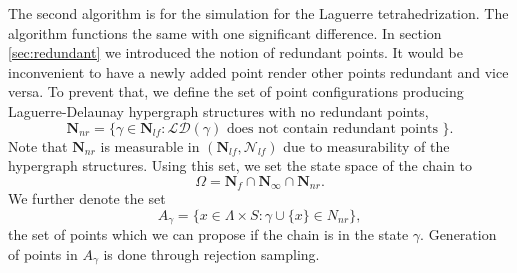 The second algorithm is for the simulation for the Laguerre tetrahedrization. The algorithm functions the same with one significant difference. In section \ref{sec:redundant} we introduced the notion of redundant points. It would be inconvenient to have a newly added point render other points redundant and vice versa. To prevent that, we define the set of point configurations producing Laguerre-Delaunay hypergraph structures with no redundant points,
$$\mathbf N_{nr} = \{ \gamma \in \mathbf N_{lf}: \mathcal {LD}(\gamma) \text{ does not contain redundant points }\}.$$ 
Note that $\mathbf N_{nr}$ is  measurable in $(\mathbf N_{lf}, \mathcal N_{lf})$ due to measurability of the hypergraph structures.  Using this set, we set the state space of the chain to
$$\Omega = \mathbf N_f \cap \mathbf N_\infty \cap \mathbf N_{nr}.$$
We further denote the set 
$$A_\gamma = \{ x \in \Lambda \times S: \gamma\cup\{x\} \in N_{nr}\},$$
the set of points which we can propose if the chain is in the state $\gamma$. Generation of points in $A_\gamma$ is done through rejection sampling.


